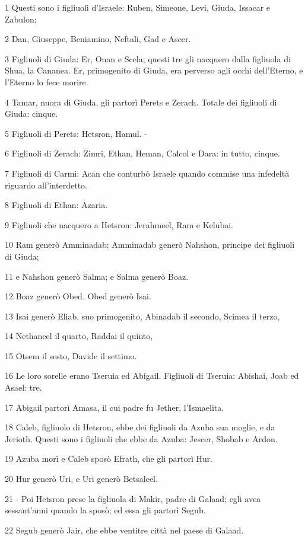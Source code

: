 \par 1 Questi sono i figliuoli d'Israele: Ruben, Simeone, Levi, Giuda, Issacar e Zabulon;
\par 2 Dan, Giuseppe, Beniamino, Neftali, Gad e Ascer.
\par 3 Figliuoli di Giuda: Er, Onan e Scela; questi tre gli nacquero dalla figliuola di Shua, la Cananea. Er, primogenito di Giuda, era perverso agli occhi dell'Eterno, e l'Eterno lo fece morire.
\par 4 Tamar, nuora di Giuda, gli partorì Perets e Zerach. Totale dei figliuoli di Giuda: cinque.
\par 5 Figliuoli di Perets: Hetsron, Hamul. -
\par 6 Figliuoli di Zerach: Zimri, Ethan, Heman, Calcol e Dara: in tutto, cinque.
\par 7 Figliuoli di Carmi: Acan che conturbò Israele quando commise una infedeltà riguardo all'interdetto.
\par 8 Figliuoli di Ethan: Azaria.
\par 9 Figliuoli che nacquero a Hetsron: Jerahmeel, Ram e Kelubai.
\par 10 Ram generò Amminadab; Amminadab generò Nahshon, principe dei figliuoli di Giuda;
\par 11 e Nahshon generò Salma; e Salma generò Boaz.
\par 12 Boaz generò Obed. Obed generò Isai.
\par 13 Isai generò Eliab, suo primogenito, Abinadab il secondo, Scimea il terzo,
\par 14 Nethaneel il quarto, Raddai il quinto,
\par 15 Otsem il sesto, Davide il settimo.
\par 16 Le loro sorelle erano Tseruia ed Abigail. Figliuoli di Tseruia: Abishai, Joab ed Asael: tre.
\par 17 Abigail partorì Amasa, il cui padre fu Jether, l'Ismaelita.
\par 18 Caleb, figliuolo di Hetsron, ebbe dei figliuoli da Azuba sua moglie, e da Jerioth. Questi sono i figliuoli che ebbe da Azuba: Jescer, Shobab e Ardon.
\par 19 Azuba morì e Caleb sposò Efrath, che gli partorì Hur.
\par 20 Hur generò Uri, e Uri generò Betsaleel.
\par 21 - Poi Hetsron prese la figliuola di Makir, padre di Galaad; egli avea sessant'anni quando la sposò; ed essa gli partorì Segub.
\par 22 Segub generò Jair, che ebbe ventitre città nel paese di Galaad.
